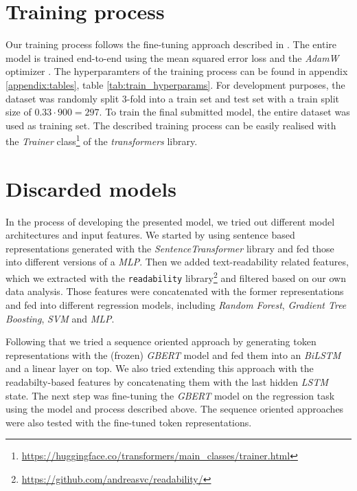 \documentclass[11pt, DIV12]{scrartcl}
\begin{document}
\section{Training process}
\label{sec:train}

Our training process follows the fine-tuning approach described in \cite{DBLP:journals/corr/abs-1810-04805}. The entire model is trained end-to-end using the mean squared error loss and the \textit{AdamW} optimizer \cite{DBLP:journals/corr/abs-1711-05101}. The hyperparamters of the training process can be found in appendix \ref{appendix:tables}, table \ref{tab:train_hyperparams}. For development purposes, the dataset was randomly split 3-fold into a train set and test set with a train split size of \(0.33 \cdot 900 = 297\). To train the final submitted model, the entire dataset was used as training set. The described training process can be easily realised with the \textit{Trainer} class\footnote{\url{https://huggingface.co/transformers/main_classes/trainer.html}} of the \textit{transformers} library.


\section{Discarded models}
In the process of developing the presented model, we tried out different model architectures and input features. We started by using sentence based representations generated with the \textit{SentenceTransformer} \cite{reimers-2019-sentence-bert} library and fed those into different versions of a \textit{MLP}. Then we added text-readability related features, which we extracted with the \texttt{readability} library\footnote{\url{https://github.com/andreasvc/readability/}} and filtered based on our own data analysis. Those features were concatenated with the former representations and fed into different regression models, including \textit{Random Forest}, \textit{Gradient Tree Boosting}, \textit{SVM} and \textit{MLP}.

Following that we tried a sequence oriented approach by generating token representations with the (frozen) \textit{GBERT} model and fed them into an \textit{BiLSTM} and a linear layer on top. We also tried extending this approach with the readabilty-based features by concatenating them with the last hidden \textit{LSTM} state. The next step was fine-tuning the \textit{GBERT} model on the regression task using the model and process described above. The sequence oriented approaches were also tested with the fine-tuned token representations.
\end{document}
